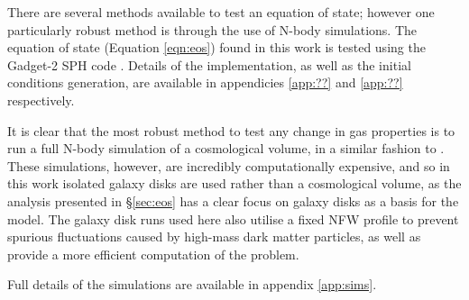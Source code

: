 There are several methods available to test an equation of state; however one particularly robust method is through the use of N-body simulations.
The equation of state (Equation \ref{eqn:eos}) found in this work is tested using the Gadget-2 SPH code \citep{springel2005}.
Details of the implementation, as well as the initial conditions generation, are available in appendicies \ref{app:??} and \ref{app:??} respectively.

It is clear that the most robust method to test any change in gas properties is to run a full N-body simulation of a cosmological volume, in a similar fashion to \citet{schaye2015, volksberger2014}.
These simulations, however, are incredibly computationally expensive, and so in this work isolated galaxy disks are used rather than a cosmological volume, as the analysis presented in \S \ref{sec:eos} has a clear focus on galaxy disks as a basis for the model.
The galaxy disk runs used here also utilise a fixed NFW profile \citep{frenk1987?} to prevent spurious fluctuations caused by high-mass dark matter particles, as well as provide a more efficient computation of the problem.

Full details of the simulations are available in appendix \ref{app:sims}.

